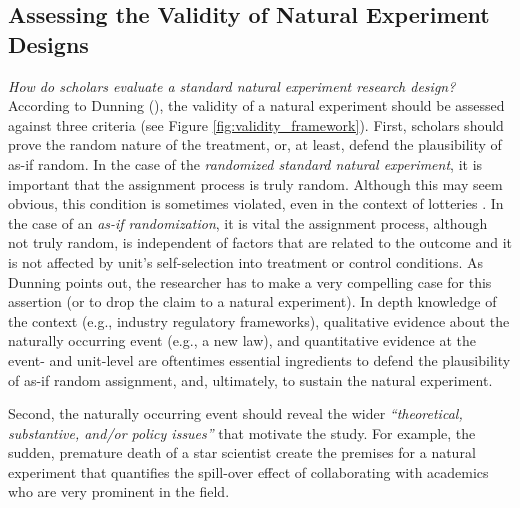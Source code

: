 \documentclass[nobib]{tufte-handout}
\begin{document}
\begin{refsection}
\subsection{Assessing the Validity of Natural Experiment Designs}
\label{sub:validity_framework}

\emph{How do scholars evaluate a standard natural experiment research
design?} According to Dunning (\cite*[][page 27]{Dunning2012}), the validity of
a natural experiment should be assessed against three criteria (see Figure
\ref{fig:validity_framework}).  First, scholars should prove the random
nature of the treatment, or, at least, defend the plausibility of as-if random.
In the case of the \emph{randomized standard natural experiment}, it is
important that the assignment process is truly random. Although this may seem
obvious, this condition is sometimes violated, even in the context of lotteries
\parencite[e.g.][]{Starr1997}. In the case of an \emph{as-if randomization}, it
is vital the assignment process, although not truly random, is independent of
factors that are related to the outcome and it is not affected by unit's
self-selection into treatment or control conditions. As Dunning points out, the
researcher has to make a very compelling case for this assertion (or to drop the
claim to a natural experiment). In depth knowledge of the context (e.g.,
industry regulatory frameworks), qualitative evidence about the naturally
occurring event (e.g., a new law), and quantitative evidence at the event- and
unit-level are oftentimes essential ingredients to defend the plausibility of
as-if random assignment, and, ultimately, to sustain the natural experiment.

Second, the naturally occurring event should reveal the wider
\emph{``theoretical, substantive, and/or policy issues''} \parencite[][page
29]{Dunning2012} that motivate the study. For example, the sudden, premature
death of a star scientist \parencite[][]{Azoulay2010} create the premises for a
natural experiment that quantifies the spill-over effect of collaborating with
academics who are very prominent in the field.


\end{refsection}
\end{document}
